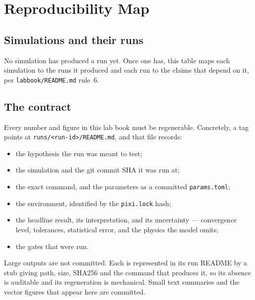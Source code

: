 
\section{Reproducibility Map}
\label{sec:reproducibility-map}

\subsection*{Simulations and their runs}

No simulation has produced a run yet. Once one has, this table maps each simulation to the runs it
produced and each run to the claims that depend on it, per \texttt{labbook/README.md} rule~6.

\subsection*{The contract}

Every number and figure in this lab book must be regenerable. Concretely, a  tag points
at \texttt{runs/<run-id>/README.md}, and that file records:

\begin{itemize}
  \item the hypothesis the run was meant to test;
  \item the simulation and the git commit SHA it was run at;
  \item the exact command, and the parameters as a committed \texttt{params.toml};
  \item the environment, identified by the \texttt{pixi.lock} hash;
  \item the headline result, its interpretation, and its uncertainty --- convergence level,
        tolerances, statistical error, and the physics the model omits;
  \item the gates that were run.
\end{itemize}

Large outputs are not committed. Each is represented in its run README by a stub giving path, size,
SHA256 and the command that produces it, so its absence is auditable and its regeneration is
mechanical. Small text summaries and the vector figures that appear here are committed.

